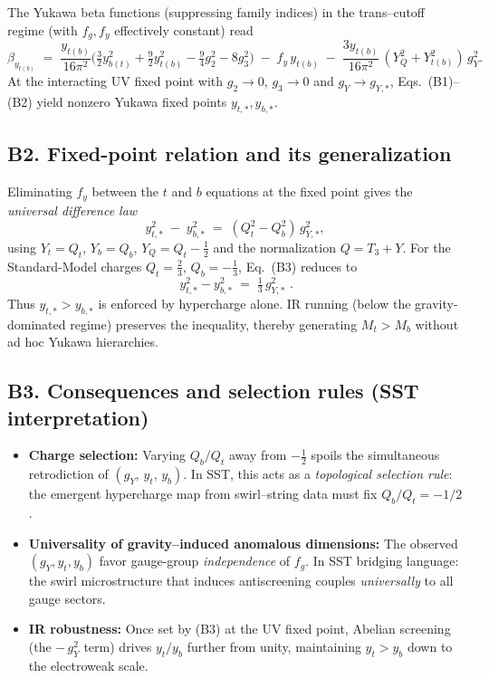 \documentclass[11pt]{article}
\begin{document}
          The Yukawa beta functions (suppressing family indices) in the trans–cutoff regime (with $f_g, f_y$ effectively constant) read
          \begin{equation}\tag{B2}
          \beta_{y_{t(b)}} \;=\; \frac{y_{t(b)}}{16\pi^2}
          \Big(\tfrac{3}{2}y_{b(t)}^2 + \tfrac{9}{2}y_{t(b)}^2 - \tfrac{9}{4}g_2^2 - 8g_3^2\Big)
          \;-\; f_y\,y_{t(b)}
          \;-\; \frac{3y_{t(b)}}{16\pi^2}\,(Y_Q^2+Y_{t(b)}^2)\,g_Y^2 .
          \end{equation}
          At the interacting UV fixed point with $g_2\!\to\!0$, $g_3\!\to\!0$ and $g_Y\!\to\!g_{Y,*}$, Eqs.~(B1)–(B2) yield nonzero Yukawa fixed points $y_{t,*},y_{b,*}$.

      \subsection*{B2. Fixed-point relation and its generalization}
          Eliminating $f_y$ between the $t$ and $b$ equations at the fixed point gives the \emph{universal difference law}
          \begin{equation}\tag{B3}
          y_{t,*}^2 \;-\; y_{b,*}^2 \;=\; (Q_t^2 - Q_b^2)\, g_{Y,*}^2 ,
          \end{equation}
          using $Y_t=Q_t$, $Y_b=Q_b$, $Y_Q=Q_t-\tfrac12$ and the normalization $Q=T_3+Y$. For the Standard-Model charges $Q_t=\tfrac{2}{3}$, $Q_b=-\tfrac{1}{3}$, Eq.~(B3) reduces to
          \begin{equation}\tag{B3-SM}
          \boxed{\, y_{t,*}^2 - y_{b,*}^2 \;=\; \tfrac{1}{3}\, g_{Y,*}^2 \,}\, .
          \end{equation}
          Thus $y_{t,*}\!>\!y_{b,*}$ is enforced by hypercharge alone. IR running (below the gravity-dominated regime) preserves the inequality, thereby generating $M_t\!>\!M_b$ without ad hoc Yukawa hierarchies.

      \subsection*{B3. Consequences and selection rules (SST interpretation)}
          \begin{itemize}
          \item \textbf{Charge selection:} Varying $Q_b/Q_t$ away from $-\tfrac12$ spoils the simultaneous retrodiction of $(g_Y,\,y_t,\,y_b)$. In SST, this acts as a \emph{topological selection rule}: the emergent hypercharge map from swirl–string data must fix $Q_b/Q_t=-1/2$.
          \item \textbf{Universality of gravity–induced anomalous dimensions:} The observed $(g_Y, y_t, y_b)$ favor gauge-group \emph{independence} of $f_g$. In SST bridging language: the swirl microstructure that induces antiscreening couples \emph{universally} to all gauge sectors.
          \item \textbf{IR robustness:} Once set by (B3) at the UV fixed point, Abelian screening (the $-\,g_Y^2$ term) drives $y_t/y_b$ further from unity, maintaining $y_t>y_b$ down to the electroweak scale.
          \end{itemize}
\end{document}
